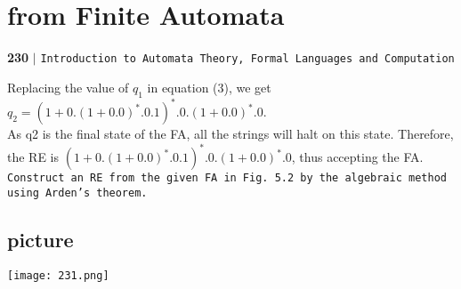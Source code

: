 \documentclass[9pt]{beamer}
\begin{document}
\begin{frame}
 \section*{from Finite Automata}
\begin{flushleft}
    \textbf{230}\hspace*{0.1cm} \textbf{$|$} \hspace*{0.1cm} \texttt{Introduction to Automata Theory, Formal Languages and Computation}
  \end{flushleft}
  
  \vspace*{0.5cm}
  \small{
 \hspace*{0.5cm} Replacing the value of $q_1$ in equation (3), we get\\
 
\hspace*{2.5cm} $q_2 = (1 + 0.(1 + 0.0)^*.0.1)^*.0. (1 + 0.0)^*.0.$ \\


 \hspace*{0.5cm} As q2 is the final state of the FA, all the strings will halt on this state. Therefore, the RE is $(1 + 0.
(1 + 0.0)^*.0.1)^*.0. (1 + 0.0)^*.0$, thus accepting the FA.\\
}
\hspace*{0.1cm} \texttt{\small{Construct an RE from the given FA in Fig. 5.2 by the algebraic method using Arden’s theorem.}} \\

\begin{center}
\section{picture}
\texttt{[image: 231.png]}
\end{center}

\end{frame}
\end{document}

